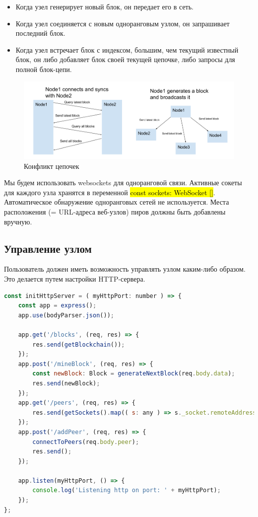 \documentclass{article}
\begin{document}
\begin{itemize}
	\item Когда узел генерирует новый блок, он передает его в сеть.
	\item Когда узел соединяется с новым одноранговым узлом, он запрашивает последний блок.
	\item Когда узел встречает блок с индексом, большим, чем текущий известный блок, он либо добавляет блок своей текущей цепочке, либо запросы для полной блок-цепи.
\end{itemize}


\begin{figure}
	\centering
	\includegraphics[scale=0.4]{p2p_communication}
	\caption{Конфликт цепочек}
	\label{fig:p2p_communication}
\end{figure}


Мы будем использовать websockets для одноранговой связи. Активные сокеты для каждого узла хранятся в переменной \hl{const sockets: WebSocket []}. Автоматическое обнаружение одноранговых сетей не используется. Места расположения (= URL-адреса веб-узлов) пиров должны быть добавлены вручную.

\subsection{Управление узлом}

Пользователь должен иметь возможность управлять узлом каким-либо образом. Это делается путем настройки HTTP-сервера.

\begin{lstlisting}[language=JavaScript, caption={Управление узлом сети}]
const initHttpServer = ( myHttpPort: number ) => {
	const app = express();
	app.use(bodyParser.json());
	
	app.get('/blocks', (req, res) => {
		res.send(getBlockchain());
	});
	app.post('/mineBlock', (req, res) => {
		const newBlock: Block = generateNextBlock(req.body.data);
		res.send(newBlock);
	});
	app.get('/peers', (req, res) => {
		res.send(getSockets().map(( s: any ) => s._socket.remoteAddress + ':' + s._socket.remotePort));
	});
	app.post('/addPeer', (req, res) => {
		connectToPeers(req.body.peer);
		res.send();
	});
	
	app.listen(myHttpPort, () => {
		console.log('Listening http on port: ' + myHttpPort);
	});
};
\end{lstlisting}
\end{document}

